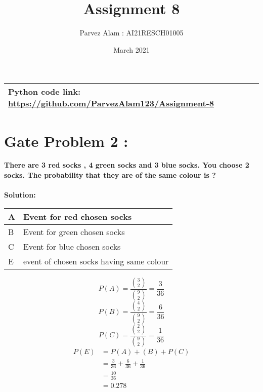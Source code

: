 \documentclass{article}
\title{Assignment 8}
\author{Parvez Alam : AI21RESCH01005 }
\date{March 2021}
\begin{document}
\maketitle
\begin{multicols}{2}
\begin{center}
    \begin{tabular}{|p{5cm}|}
    \hline
        Python code link: \url{https://github.com/ParvezAlam123/Assignment-8} \\
    \hline
    \end{tabular}
\end{center}
\section{Gate Problem 2 :}
\textbf{There are 3 red socks , 4 green socks and 3 blue socks. You choose 2 socks. The probability that they are of the same colour is ?} \\ \\
\textbf{Solution:}
\begin{center}
    \begin{tabular}{|p{1cm}|p{4cm}|}
    \hline
       A & Event for red chosen socks \\
       \hline
        B & Event for green chosen socks \\
        \hline
        C & Event for blue chosen socks \\
        \hline
        E & event of chosen socks having same colour \\
        \hline
    \end{tabular}
\end{center}
\[P(A)=\frac{\binom{3}{2}}{\binom{9}{2}}=\frac{3}{36}\]
\[P(B)=\frac{\binom{4}{2}}{\binom{9}{2}}=\frac{6}{36}\]
\[P(C)=\frac{\binom{2}{2}}{\binom{9}{2}}=\frac{1}{36}\]
\begin{align}
    P(E) &=P(A)+(B)+P(C) \nonumber \\
         &=\frac{3}{36}+\frac{6}{36}+\frac{1}{36} \nonumber \\
         &=\frac{10}{36} \nonumber \\
         &=0.278 \nonumber 
\end{align}




\end{multicols}
\end{document}
